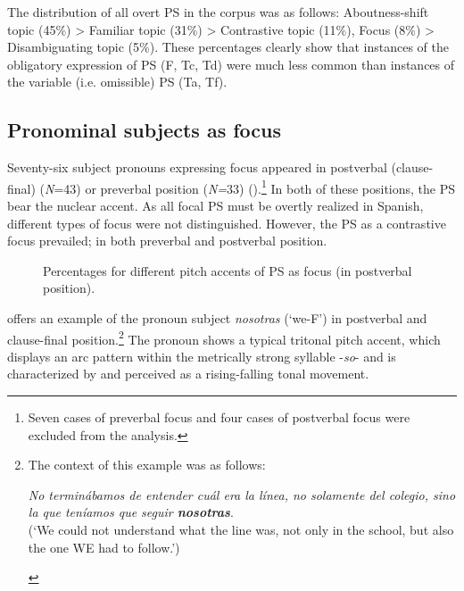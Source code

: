\documentclass[output=paper]{langsci/langscibook}
\begin{document}
The distribution of all overt PS in the corpus was as follows: Aboutness-shift topic (45\%) > Familiar topic (31\%) > Contrastive topic (11\%), Focus (8\%) > Disambiguating topic (5\%). These percentages clearly show that instances of the obligatory expression of PS (F, Tc, Td) were much less common than instances of the variable (i.e. omissible) PS (Ta, Tf).
  
\subsection{Pronominal subjects as focus}
\label{sec:pes:4.1}
Seventy-six subject pronouns expressing focus appeared in postverbal (clause-final) (\textit{N}=43) or preverbal position (\textit{N=}33) ().\footnote{Seven cases of preverbal focus and four cases of postverbal focus were excluded from the analysis.} In both of these positions, the PS bear the nuclear accent. As all focal PS must be overtly realized in Spanish, different types of focus were not distinguished. However, the PS as a contrastive focus prevailed; in both preverbal and postverbal position.


\begin{figure}
\caption{Percentages for different pitch accents of PS as focus (in postverbal position).\label{fig:pes:7}}
\end{figure}

 offers an example of the pronoun subject \textit{nosotras} (‘we-F’) in postverbal and clause-final position.\footnote{The context of this example was as follows:

\begin{exe}
\textit{No terminábamos de entender cuál era la línea, no solamente del colegio, sino la que teníamos que seguir \textbf{nosotras}}.\\
(‘We could not understand what the line was, not only in the school, but also the one WE had to follow.’)
\end{exe}\vspace*{-\baselineskip}} 
The pronoun shows a typical tritonal pitch accent, which displays an arc pattern within the metrically strong syllable -\textit{so}- and is characterized by and perceived as a rising-falling tonal movement.
\end{document}
